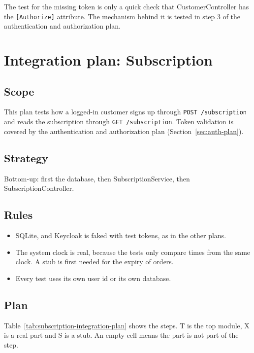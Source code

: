 \documentclass[a4paper,11pt]{article}
\begin{document}
The test for the missing token is only a quick check that CustomerController has the \texttt{[Authorize]} attribute. The mechanism behind it is tested in step 3 of the authentication and authorization plan.

\section{Integration plan: Subscription}
\label{sec:subscription-plan}

\subsection{Scope}
This plan tests how a logged-in customer signs up through \texttt{POST /subscription} and reads the subscription through \texttt{GET /subscription}. Token validation is covered by the authentication and authorization plan (Section~\ref{sec:auth-plan}).

\subsection{Strategy}
Bottom-up: first the database, then SubscriptionService, then SubscriptionController.

\subsection{Rules}
\begin{itemize}
  \item SQLite, and Keycloak is faked with test tokens, as in the other plans.
  \item The system clock is real, because the tests only compare times from the same clock. A stub is first needed for the expiry of orders.
  \item Every test uses its own user id or its own database.
\end{itemize}

\subsection{Plan}
Table~\ref{tab:subscription-integration-plan} shows the steps. T is the top module, X is a real part and S is a stub. An empty cell means the part is not part of the step.
\end{document}
